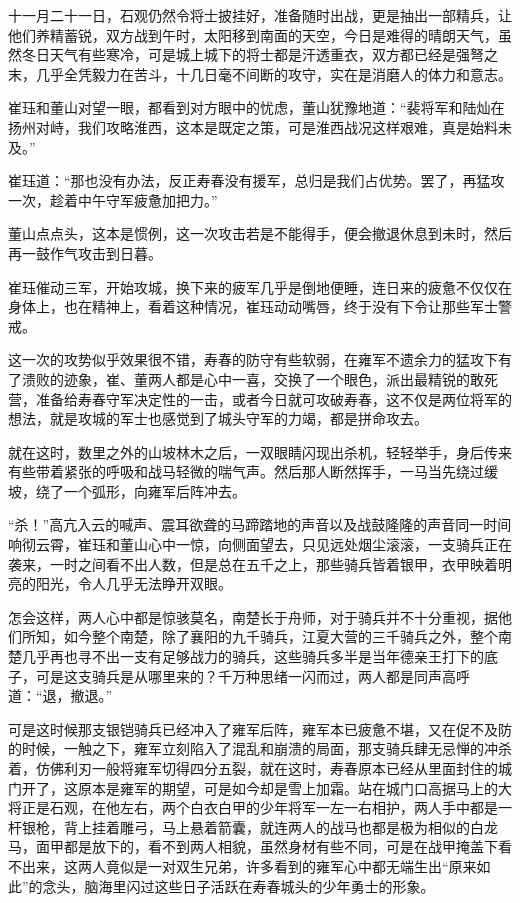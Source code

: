 十一月二十一日，石观仍然令将士披挂好，准备随时出战，更是抽出一部精兵，让他们养精蓄锐，双方战到午时，太阳移到南面的天空，今日是难得的晴朗天气，虽然冬日天气有些寒冷，可是城上城下的将士都是汗透重衣，双方都已经是强弩之末，几乎全凭毅力在苦斗，十几日毫不间断的攻守，实在是消磨人的体力和意志。

崔珏和董山对望一眼，都看到对方眼中的忧虑，董山犹豫地道：“裴将军和陆灿在扬州对峙，我们攻略淮西，这本是既定之策，可是淮西战况这样艰难，真是始料未及。”

崔珏道：“那也没有办法，反正寿春没有援军，总归是我们占优势。罢了，再猛攻一次，趁着中午守军疲惫加把力。”

董山点点头，这本是惯例，这一次攻击若是不能得手，便会撤退休息到未时，然后再一鼓作气攻击到日暮。

崔珏催动三军，开始攻城，换下来的疲军几乎是倒地便睡，连日来的疲惫不仅仅在身体上，也在精神上，看着这种情况，崔珏动动嘴唇，终于没有下令让那些军士警戒。

这一次的攻势似乎效果很不错，寿春的防守有些软弱，在雍军不遗余力的猛攻下有了溃败的迹象，崔、董两人都是心中一喜，交换了一个眼色，派出最精锐的敢死营，准备给寿春守军决定性的一击，或者今日就可攻破寿春，这不仅是两位将军的想法，就是攻城的军士也感觉到了城头守军的力竭，都是拼命攻去。

就在这时，数里之外的山坡林木之后，一双眼睛闪现出杀机，轻轻举手，身后传来有些带着紧张的呼吸和战马轻微的喘气声。然后那人断然挥手，一马当先绕过缓坡，绕了一个弧形，向雍军后阵冲去。

“杀！”高亢入云的喊声、震耳欲聋的马蹄踏地的声音以及战鼓隆隆的声音同一时间响彻云霄，崔珏和董山心中一惊，向侧面望去，只见远处烟尘滚滚，一支骑兵正在袭来，一时之间看不出人数，但是总在五千之上，那些骑兵皆着银甲，衣甲映着明亮的阳光，令人几乎无法睁开双眼。

怎会这样，两人心中都是惊骇莫名，南楚长于舟师，对于骑兵并不十分重视，据他们所知，如今整个南楚，除了襄阳的九千骑兵，江夏大营的三千骑兵之外，整个南楚几乎再也寻不出一支有足够战力的骑兵，这些骑兵多半是当年德亲王打下的底子，可是这支骑兵是从哪里来的？千万种思绪一闪而过，两人都是同声高呼道：“退，撤退。”

可是这时候那支银铠骑兵已经冲入了雍军后阵，雍军本已疲惫不堪，又在促不及防的时候，一触之下，雍军立刻陷入了混乱和崩溃的局面，那支骑兵肆无忌惮的冲杀着，仿佛利刃一般将雍军切得四分五裂，就在这时，寿春原本已经从里面封住的城门开了，这原本是雍军的期望，可是如今却是雪上加霜。站在城门口高据马上的大将正是石观，在他左右，两个白衣白甲的少年将军一左一右相护，两人手中都是一杆银枪，背上挂着雕弓，马上悬着箭囊，就连两人的战马也都是极为相似的白龙马，面甲都是放下的，看不到两人相貌，虽然身材有些不同，可是在战甲掩盖下看不出来，这两人竟似是一对双生兄弟，许多看到的雍军心中都无端生出“原来如此”的念头，脑海里闪过这些日子活跃在寿春城头的少年勇士的形象。

